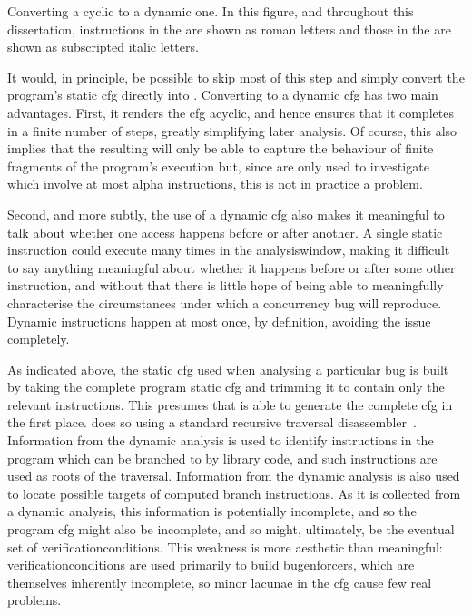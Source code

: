 \begin{sanefig}
\caption{Converting a cyclic  to a dynamic
  one.  In this figure, and throughout this dissertation, instructions
  in the  are shown as roman letters and
  those in the  are shown as subscripted
  italic letters.}
\label{fig:cyclic_cfg}
\end{sanefig}

It would, in principle, be possible to skip most of this step and
simply convert the program's \gls{static cfg} directly into
{\AStateMachine}.  Converting to a \gls{dynamic cfg} has two main
advantages.  First, it renders the \gls{cfg} acyclic, and hence
ensures that it completes in a finite number of steps, greatly
simplifying later analysis.  Of course, this also implies that the
resulting {\StateMachine} will only be able to capture the behaviour
of finite fragments of the program's execution but, since
{\StateMachines} are only used to investigate  which involve at most \gls{alpha}
instructions, this is not in practice a problem.

Second, and more subtly, the use of a \gls{dynamic cfg} also makes it
meaningful to talk about whether one access happens before or after
another.  A single static instruction could execute many times in the
\gls{analysiswindow}, making it difficult to say anything meaningful
about whether it happens before or after some other instruction, and
without that there is little hope of being able to meaningfully
characterise the circumstances under which a concurrency bug will
reproduce.  Dynamic instructions happen at most once, by definition,
avoiding the issue completely.

As indicated above, the \gls{static cfg} used when analysing a
particular bug is built by taking the complete program \gls{static
  cfg} and trimming it to contain only the relevant instructions.
This presumes that {\technique} is able to generate the complete
\gls{cfg} in the first place.  {\Technique} does so using a standard
recursive traversal disassembler~\cite{Schwarz}.  Information from the
dynamic analysis is used to identify instructions in the program which
can be branched to by library code, and such instructions are used as
roots of the traversal.  Information from the dynamic analysis is also
used to locate possible targets of computed branch instructions.  As
it is collected from a dynamic analysis, this information is
potentially incomplete, and so the program \gls{cfg} might also be
incomplete, and so might, ultimately, be the eventual set of
\glspl{verificationcondition}.  This weakness is more aesthetic than
meaningful: \glspl{verificationcondition} are used primarily to build
\glspl{bugenforcer}, which are themselves inherently incomplete, so
minor lacunae in the \gls{cfg} cause few real problems.

